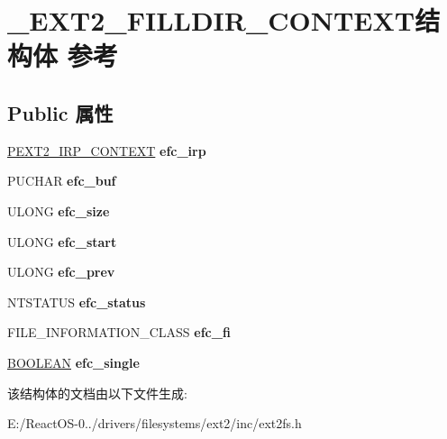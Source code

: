 \hypertarget{struct___e_x_t2___f_i_l_l_d_i_r___c_o_n_t_e_x_t}{}\section{\+\_\+\+E\+X\+T2\+\_\+\+F\+I\+L\+L\+D\+I\+R\+\_\+\+C\+O\+N\+T\+E\+X\+T结构体 参考}
\label{struct___e_x_t2___f_i_l_l_d_i_r___c_o_n_t_e_x_t}
\subsection*{Public 属性}
\begin{DoxyCompactItemize}
\item 
\mbox{\label{struct___e_x_t2___f_i_l_l_d_i_r___c_o_n_t_e_x_t_a07d842c16a6369e031165a4069b13aa0}} 
\hyperlink{structext2__icb}{P\+E\+X\+T2\+\_\+\+I\+R\+P\+\_\+\+C\+O\+N\+T\+E\+XT} {\bfseries efc\+\_\+irp}
\item 
\mbox{\label{struct___e_x_t2___f_i_l_l_d_i_r___c_o_n_t_e_x_t_ad92ef1d41dbce2b0ee9fdf09c18fd386}} 
P\+U\+C\+H\+AR {\bfseries efc\+\_\+buf}
\item 
\mbox{\label{struct___e_x_t2___f_i_l_l_d_i_r___c_o_n_t_e_x_t_a4ad156b3e58af06c20525857cbdaf642}} 
U\+L\+O\+NG {\bfseries efc\+\_\+size}
\item 
\mbox{\label{struct___e_x_t2___f_i_l_l_d_i_r___c_o_n_t_e_x_t_a460d565824e844e5455ecd588b7ce139}} 
U\+L\+O\+NG {\bfseries efc\+\_\+start}
\item 
\mbox{\label{struct___e_x_t2___f_i_l_l_d_i_r___c_o_n_t_e_x_t_a0adc3d471af1377ae4d9ec680ff192ac}} 
U\+L\+O\+NG {\bfseries efc\+\_\+prev}
\item 
\mbox{\label{struct___e_x_t2___f_i_l_l_d_i_r___c_o_n_t_e_x_t_a3e3ecf1f01803fb5a47e7910b913c114}} 
N\+T\+S\+T\+A\+T\+US {\bfseries efc\+\_\+status}
\item 
\mbox{\label{struct___e_x_t2___f_i_l_l_d_i_r___c_o_n_t_e_x_t_a241ececbd85f16ba27941e88075f453f}} 
F\+I\+L\+E\+\_\+\+I\+N\+F\+O\+R\+M\+A\+T\+I\+O\+N\+\_\+\+C\+L\+A\+SS {\bfseries efc\+\_\+fi}
\item 
\mbox{\label{struct___e_x_t2___f_i_l_l_d_i_r___c_o_n_t_e_x_t_a0f1519a1d58c151974e019cc86e9ac32}} 
\hyperlink{_processor_bind_8h_a112e3146cb38b6ee95e64d85842e380a}{B\+O\+O\+L\+E\+AN} {\bfseries efc\+\_\+single}
\end{DoxyCompactItemize}


该结构体的文档由以下文件生成\+:\begin{DoxyCompactItemize}
\item 
E\+:/\+React\+O\+S-\/0../drivers/filesystems/ext2/inc/ext2fs.\+h\end{DoxyCompactItemize}
